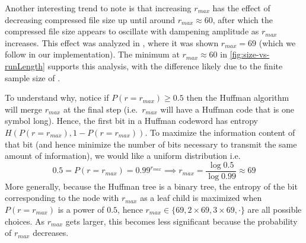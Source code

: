 \documentclass[a4paper,oneside,reqno]{hmcpset}
\begin{document}
\begin{solution}
  Another interesting trend to note is that increasing $r_{max}$ has the effect
  of decreasing compressed file size up until around $r_{max} \approx 60$,
  after which the compressed file size appears to oscillate with dampening
  amplitude as $r_{max}$ increases. This effect was analyzed in \cite{LoverH},
  where it was shown $r_{max}=69$ (which we follow in our implementation).
  The minimum at $r_{max} \approx 60$ in \autoref{fig:size-vs-runLength} supports
  this analysis, with the difference likely due to the finite sample size
  of .

  To understand why, notice if $P(r=r_{max}) \geq 0.5$ then the Huffman
  algorithm will merge $r_{max}$ at the final step (i.e.\ $r_{max}$ will have a
  Huffman code that is one symbol long). Hence, the first bit in a Huffman
  codeword has entropy $H(P(r=r_{max}), 1 - P(r=r_{max}))$. To maximize the
  information content of that bit (and hence minimize the number of bits
  necessary to transmit the same amount of information), we would like a
  uniform distribution i.e.
  \[
    0.5 = P(r=r_{max}) = 0.99^{r_{max}} \implies r_{max} = \frac{\log 0.5}{\log 0.99} \approx 69
  \]
  More generally, because the Huffman tree is a binary tree, the entropy of the
  bit corresponding to the node with $r_{max}$ as a leaf child is maximized
  when $P(r=r_{max})$ is a power of $0.5$, hence $r_{max} \in \{69, 2 \times
  69, 3 \times 69, \cdot\}$ are all possible choices. As $r_{max}$ gets larger,
  this becomes less significant because the probability of $r_{max}$ decreases.


\end{solution}


\nocite{*} %

\end{document}
